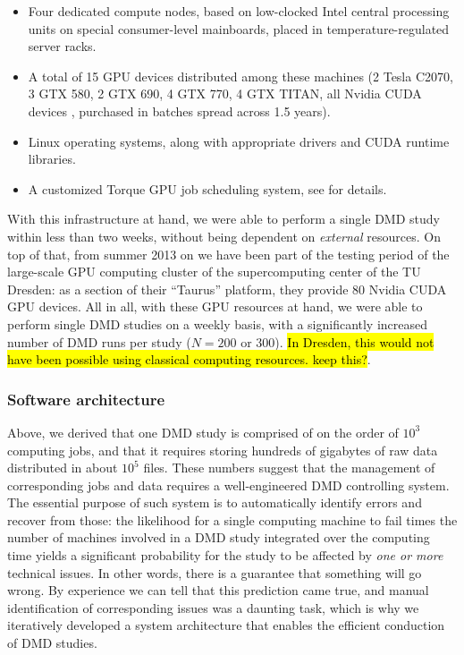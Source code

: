 \begin{itemize}
\item Four dedicated compute nodes, based on low-clocked Intel central
processing units on special consumer-level mainboards, placed in
temperature-regulated server racks.
\item A total of 15 GPU devices distributed among these machines (2 Tesla C2070,
3 GTX 580, 2 GTX 690, 4 GTX 770, 4 GTX TITAN, all Nvidia CUDA devices
\cite{nvidia_cuda_devices}, purchased in batches spread across 1.5 years).
\item Linux operating systems, along with appropriate drivers and CUDA runtime
libraries.
\item A customized Torque \cite{torque_website} GPU job scheduling system, see
\cite{gehrcke_torque_gpu_setup} for details.
\end{itemize}

With this infrastructure at hand, we were able to perform a single DMD study
within less than two weeks, without being dependent on \textit{external}
resources. On top of that, from summer 2013 on we have been part of the testing
period of the large-scale GPU computing cluster of the supercomputing center of
the TU Dresden: as a section of their \enquote{Taurus} platform, they provide 80
Nvidia CUDA GPU devices. All in all, with these GPU resources at hand, we were
able to perform single DMD studies on a weekly basis, with a significantly
increased number of DMD runs per study ($N=200$ or $300$). \hl{In Dresden, this
would not have been possible using classical computing resources. keep this?}.


\subsubsection{Software architecture}

Above, we derived that one DMD study is comprised of on the order of $10^3$
computing jobs, and that it requires storing hundreds of gigabytes of raw data
distributed in about $10^5$ files. These numbers suggest that the management of
corresponding jobs and data requires a well-engineered DMD controlling system.
The essential purpose of such system is to automatically identify errors and
recover from those: the likelihood for a single computing machine to fail times
the number of machines involved in a DMD study integrated over the computing
time yields a significant probability for the study to be affected by
\textit{one or more} technical issues. In other words, there is a guarantee
that something will go wrong. By experience we can tell that this prediction
came true, and manual identification of corresponding issues was a daunting
task, which is why we iteratively developed a system architecture that enables
the efficient conduction of DMD studies.


